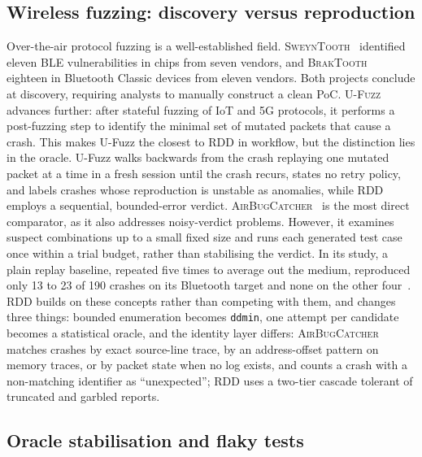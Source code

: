 \subsection{Wireless fuzzing: discovery versus reproduction}

Over-the-air protocol fuzzing is a well-established field.
\textsc{SweynTooth}~\cite{sweyntooth2020} identified eleven BLE vulnerabilities
in chips from seven vendors, and \textsc{BrakTooth}~\cite{braktooth2022} eighteen in
Bluetooth Classic devices from eleven vendors. Both projects conclude at discovery, requiring analysts to
manually construct a clean PoC. \textsc{U-Fuzz}~\cite{ufuzz2024} advances further:
after stateful fuzzing of IoT and 5G protocols, it performs a post-fuzzing step to
identify the minimal set of mutated packets that cause a crash. This makes U-Fuzz
the closest to RDD in workflow, but the distinction lies in the oracle. U-Fuzz walks
backwards from the crash replaying one mutated packet at a time in a fresh session
until the crash recurs, states no retry policy, and labels crashes whose
reproduction is unstable as anomalies, while RDD employs a sequential,
bounded-error verdict.
\textsc{AirBugCatcher}~\cite{airbugcatcher2024} is the most direct comparator, as it
also addresses noisy-verdict problems. However, it examines suspect combinations up
to a small fixed size and runs each generated test case once within a trial budget,
rather than stabilising the verdict. In its study, a plain replay baseline,
repeated five times to average out the medium, reproduced only 13 to 23 of 190
crashes on its Bluetooth target and none on the other four~\cite{airbugcatcher2024}. %
RDD builds on these concepts rather than competing with them, and changes three
things: bounded enumeration becomes \texttt{ddmin}, one attempt per candidate becomes
a statistical oracle, and the identity layer differs: \textsc{AirBugCatcher} matches crashes by exact source-line trace,
by an address-offset pattern on memory traces, or by packet state when no log
exists, and counts a crash with a non-matching identifier as ``unexpected'';
RDD uses a two-tier cascade tolerant of truncated and garbled reports.

\subsection{Oracle stabilisation and flaky tests}

